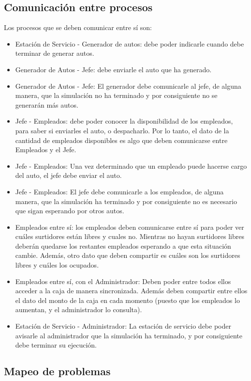 \documentclass[a4paper,12pt]{article}
\begin{document}
\subsection{Comunicación entre procesos}
Los procesos que se deben comunicar entre sí son:
\begin{itemize}
	\item Estación de Servicio - Generador de autos: debe poder indicarle cuando debe terminar
	de generar autos.
	\item Generador de Autos - Jefe: debe enviarle el auto que ha generado.
	\item Generador de Autos - Jefe: El generador debe comunicarle al jefe, de alguna manera,
	que	la simulación no ha terminado y por consiguiente no se generarán más autos.
	\item Jefe - Empleados: debe poder conocer la disponibilidad de los empleados, para saber
	si enviarles el auto, o despacharlo. Por lo tanto, el dato de la cantidad de empleados
	disponibles es algo que deben comunicarse entre Empleados y el Jefe.
	\item Jefe - Empleados: Una vez determinado que un empleado puede hacerse cargo del auto, 
	el jefe debe enviar el auto.
	\item Jefe - Empleados: El jefe debe comunicarle a los empleados, de alguna manera, que
	la simulación ha terminado y por consiguiente no es necesario que sigan esperando por
	otros autos. 
	\item Empleados entre sí: los empleados deben comunicarse entre sí para poder ver cuáles
	surtidores están libres y cuales no. Mientras no hayan surtidores libres deberán quedarse
	los restantes empleados esperando a que esta situación cambie. Además, otro dato que deben
	compartir es cuáles son los surtidores libres y cuáles los ocupados.
	\item Empleados entre sí, con el Administrador: Deben poder entre todos ellos acceder a
	la caja de manera sincronizada. Además deben compartir entre ellos el dato del monto de
	la caja en cada momento (puesto que los empleados lo aumentan, y el administrador lo
	consulta).
	\item Estación de Servicio - Administrador: La estación de servicio debe poder avisarle
	al administrador que la simulación ha terminado, y por consiguiente debe terminar su
	ejecución.
\end{itemize}

\subsection{Mapeo de problemas}
\end{document}
